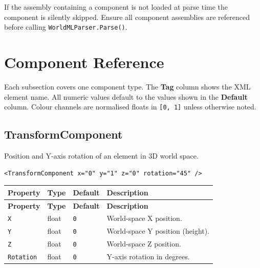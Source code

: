 \documentclass[11pt,a4paper]{article}
\begin{document}
\begin{warnbox}
  If the assembly containing a component is not loaded at parse time the
  component is silently skipped.  Ensure all component assemblies are
  referenced before calling \texttt{WorldMLParser.Parse()}.
\end{warnbox}

\section{Component Reference}

Each subsection covers one component type. The \textbf{Tag} column shows the
XML element name. All numeric values default to the values shown in the
\textbf{Default} column. Colour channels are normalised floats in
\texttt{[0, 1]} unless otherwise noted.

\subsection{TransformComponent}

Position and Y-axis rotation of an element in 3D world space.

\begin{lstlisting}
<TransformComponent x="0" y="1" z="0" rotation="45" />
\end{lstlisting}

\begin{longtable}{P{3cm} P{2cm} P{2.5cm} P{5.5cm}}
  \toprule
  \textbf{Property} & \textbf{Type} & \textbf{Default} & \textbf{Description} \\
  \midrule
  \endfirsthead
  \toprule
  \textbf{Property} & \textbf{Type} & \textbf{Default} & \textbf{Description} \\
  \midrule
  \endhead
  \texttt{X} & float & \texttt{0} & World-space X position. \\
  \texttt{Y} & float & \texttt{0} & World-space Y position (height). \\
  \texttt{Z} & float & \texttt{0} & World-space Z position. \\
  \texttt{Rotation} & float & \texttt{0} & Y-axis rotation in degrees. \\
  \bottomrule
\end{longtable}

\end{document}

